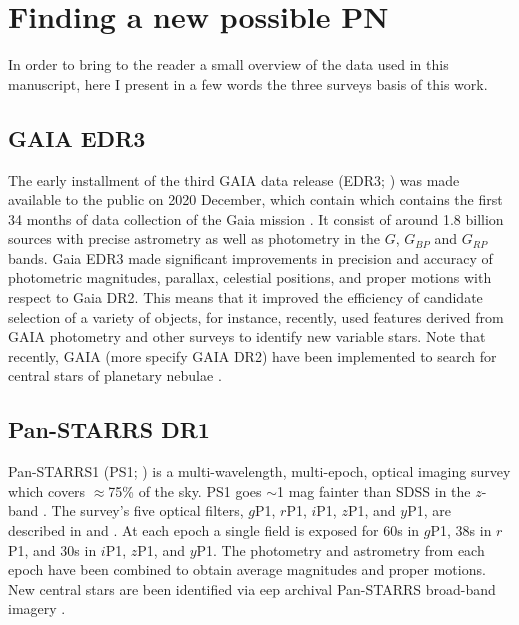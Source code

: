 \documentclass[fleqn,usenatbib]{mnras}
\begin{document}
\section{Finding a new possible PN}
\label{sec:surveys}

In order to bring to the reader a small overview of the data used
in this manuscript, here I present in a few words the three
surveys basis of this work.

\subsection{GAIA EDR3}
\label{sec:gaia}

The early installment of the third
GAIA data release (EDR3; \citealp{Brown:2021}) was made available to
the public on 2020 December, which contain which contains the first 34 months
of data collection of the Gaia mission \citep{Brown:2018}.
It consist of around 1.8 billion sources
with precise astrometry as well as photometry in
the $G$, $G_{BP}$ and $G_{RP}$ bands. Gaia EDR3 made
significant improvements in precision and accuracy of
photometric magnitudes, parallax, celestial positions, and proper
motions with respect to Gaia DR2. This means that it improved
the efficiency of candidate selection of a variety of
objects, for instance, recently,  \citet{Christy:2023} used features
derived from GAIA photometry and other surveys to identify new variable stars.
Note that recently, GAIA (more specify GAIA DR2) have been implemented
to search for central stars of planetary nebulae \citep{Chornay:2020}.

\subsection{Pan-STARRS DR1}
\label{sec:PS1}

Pan-STARRS1 (PS1; \citealp{Kaiser:2010}) is a multi-wavelength, multi-epoch,
optical imaging survey which covers $\approx$75\% of the sky. PS1 goes $\sim$1 mag
fainter than SDSS in the $z$-band \citep{York:2000}. The survey’s five optical
filters, $g$P1, $r$P1, $i$P1, $z$P1, and $y$P1, are described in
\citet{Stubbs:2010} and \citet{Tonry:2012}. At each epoch a single field
is exposed for 60s in $g$P1, 38s in $r$P1, and 30s in $i$P1, $z$P1,
and $y$P1. The photometry and astrometry from each epoch
have been combined to obtain average magnitudes and proper
motions. New central stars are been identified via
eep archival Pan-STARRS broad-band imagery \citep{Tan:2023}. 
\end{document}
